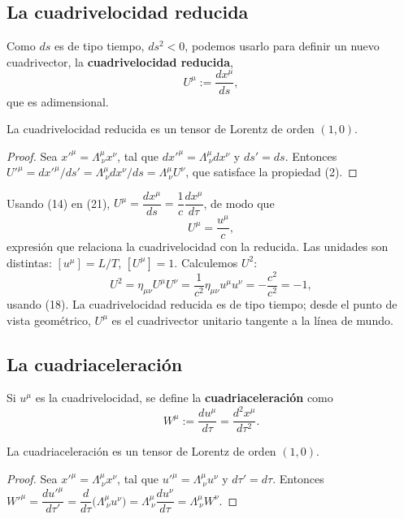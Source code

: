\subsection{La cuadrivelocidad reducida}

\begin{definicion}
Como $ds$ es de tipo tiempo, $ds^2<0$, podemos usarlo para definir un
nuevo cuadrivector, la \textbf{cuadrivelocidad reducida},
\[
U^\mu := \frac{dx^\mu}{ds}, \tag{21}
\]
que es adimensional.
\end{definicion}

\begin{proposicionc}
La cuadrivelocidad reducida es un tensor de Lorentz de orden $(1,0)$.
\end{proposicionc}

\begin{proof}
Sea $x'^\mu=\Lambda^\mu_{\ \nu}x^\nu$, tal que $dx'^\mu=\Lambda^\mu_{\
\nu}dx^\nu$ y $ds'=ds$. Entonces $U'^\mu=dx'^\mu/ds'=\Lambda^\mu_{\
\nu}dx^\nu/ds=\Lambda^\mu_{\ \nu}U^\nu$, que satisface la propiedad (2).
\qedhere
\end{proof}

Usando (14) en (21), $U^\mu=\dfrac{dx^\mu}{ds}=\dfrac1c\dfrac{dx^\mu}
{d\tau}$, de modo que
\[
U^\mu = \frac{u^\mu}{c}, \tag{22}
\]
expresión que relaciona la cuadrivelocidad con la reducida. Las
unidades son distintas: $[u^\mu]=L/T$, $[U^\mu]=1$. Calculemos $U^2$:
\[
U^2 = \eta_{\mu\nu}U^\mu U^\nu = \frac{1}{c^2}\eta_{\mu\nu}u^\mu u^\nu =
-\frac{c^2}{c^2} = -1,
\]
usando (18). La cuadrivelocidad reducida es de tipo tiempo; desde el
punto de vista geométrico, $U^\mu$ es el cuadrivector unitario tangente
a la línea de mundo.

\subsection{La cuadriaceleración}

\begin{definicion}[Cuadriaceleración]
Si $u^\mu$ es la cuadrivelocidad, se define la \textbf{cuadriaceleración}
como
\[
W^\mu := \frac{du^\mu}{d\tau} = \frac{d^2x^\mu}{d\tau^2} . \tag{23}
\]
\end{definicion}

\begin{proposicionc}
La cuadriaceleración es un tensor de Lorentz de orden $(1,0)$.
\end{proposicionc}

\begin{proof}
Sea $x'^\mu=\Lambda^\mu_{\ \nu}x^\nu$, tal que $u'^\mu=\Lambda^\mu_{\
\nu}u^\nu$ y $d\tau'=d\tau$. Entonces $W'^\mu=\dfrac{du'^\mu}{d\tau'}=
\dfrac{d}{d\tau}\big(\Lambda^\mu_{\ \nu}u^\nu\big)=\Lambda^\mu_{\
\nu}\dfrac{du^\nu}{d\tau}=\Lambda^\mu_{\ \nu}W^\nu$. \qedhere
\end{proof}

